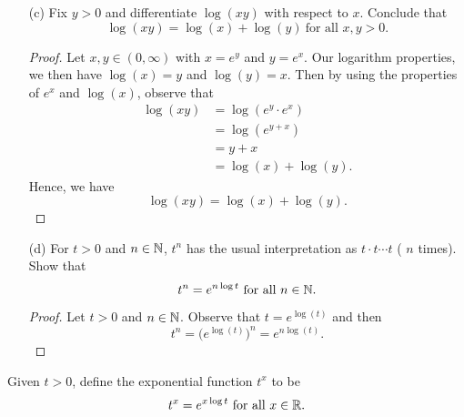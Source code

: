 \begin{enumerate}
\begin{proof}
        \end{proof}
    \item[(c)] Fix \( y > 0  \) and differentiate \( \log(xy)  \) with respect to \( x  \). Conclude that 
        \[  \log(xy) = \log(x) + \log(y) \ \text{for all } x,y > 0. \]
        \begin{proof}
        Let \( x, y \in (0,\infty )  \) with \( x = e^{y}   \) and \( y = e^{x} \). Our logarithm properties, we then have \( \log(x) = y  \) and \( \log(y) = x  \). Then by using the properties of \( e^{x}  \) and \( \log(x)   \), observe that  
        \begin{align*}
            \log(xy) &= \log(e^{y} \cdot e^{x} ) \\
                     &= \log(e^{y+x}) \\
                     &= y + x \\
                     &= \log(x) + \log(y).
        \end{align*} 
        Hence, we have 
        \[  \log(xy) = \log(x) + \log(y). \]

        \end{proof}
    \item[(d)] For \( t > 0  \) and \( n \in \mathbb{N}  \), \( t^{n} \) has the usual interpretation as \( t \cdot t \dotsb t  \) ( \( n \) times).
        Show that 
        \[  t^{n} = e^{n \log t } \ \text{for all } n \in \N.   \]
        \begin{proof}
            Let \( t>0  \) and \( n \in \mathbb{N}  \). Observe that \( t = e^{\log(t)} \) and then 
            \[  t^{n} = \Big( e^{\log(t)}  \Big)^{n} = e^{n \log (t)}. \]
        \end{proof}
\end{enumerate}

\begin{definition}{}{}
   Given \( t > 0  \), define the exponential function \( t^{x} \) to be 
   \[  t^{x} = e^{x \log t } \ \text{for all } x \in \mathbb{R}. \]
\end{definition}

